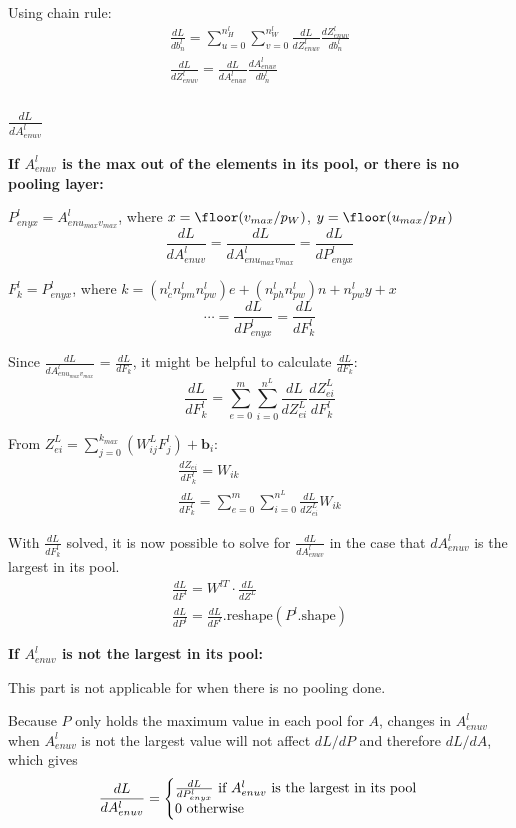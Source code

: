 \documentclass[12pt]{article}
\begin{document}
Using chain rule:
\begin{gather*}
    \frac{dL}{db^l_n} = \sum_{u=0}^{n_H^l} \sum_{v=0}^{n_W^l}
                        \frac{dL}{dZ^l_{enuv}} \frac{dZ^l_{enuv}}{db^l_n}\\
    \frac{dL}{dZ^l_{enuv}} = \frac{dL}{dA^l_{enuv}} \frac{dA^l_{enuv}}{db^l_n}
\end{gather*}

\subsubsection{$\frac{dL}{dA^l_{enuv}}$}

\textbf{If $A^l_{enuv}$ is the max out of the elements in its pool, or there is no pooling layer:}

$P^l_{enyx} = A^l_{enu_{max}v_{max}}$, where $x = \floor(v_{max}/p_{W})$, $y = \floor(u_{max}/p_H)$
\[ \frac{dL}{dA^l_{enuv}} = \frac{dL}{dA^l_{enu_{max}v_{max}}} = \frac{dL}{dP^l_{enyx}} \]

$F^l_k = P^l_{enyx}$, where $k = (n_c^l n_{pm}^l n_{pw}^l)e + (n_{ph}^l n_{pw}^l) n + n_{pw}^l y + x$
\[ \cdots = \frac{dL}{dP^l_{enyx}} = \frac{dL}{dF^l_k} \]

Since $\frac{dL}{dA^l_{enu_{max}v_{max}}}$ = $\frac{dL}{dF_k}$, it might be helpful to calculate
$\frac{dL}{dF_k}$:
\[ \frac{dL}{dF^l_k} = \sum_{e=0}^m \sum_{i=0}^{n^L} \frac{dL}{dZ^L_{ei}} \frac{dZ^L_{ei}}{dF^l_k} \]

From $Z^L_{ei} = \sum_{j=0}^{k_{max}} (W^L_{ij} F^l_j) + \bm b_i$:
\begin{gather*}
    \frac{dZ_{ei}}{dF^l_k} = W_{ik}\\
    \frac{dL}{dF^l_k} = \sum_{e=0}^m \sum_{i=0}^{n^L} \frac{dL}{dZ^L_{ei}} W_{ik}
\end{gather*}

With $\frac{dL}{dF^l_k}$ solved, it is now possible to solve for $\frac{dL}{dA^l_{enuv}}$ in
the case that $dA^l_{enuv}$ is the largest in its pool.
\begin{gather*}
    \frac{dL}{dF^l} = W^{l T} \cdot \frac{dL}{dZ^L}\\
    \frac{dL}{dP^l} = \frac{dL}{dF^l}\text{.reshape}(P^l\text{.shape})
\end{gather*}

\textbf{If $A^l_{enuv}$ is not the largest in its pool:}

This part is not applicable for when there is no pooling done.

Because $P$ only holds the maximum value in each pool for $A$, changes in $A^l_{enuv}$ when $A^l_{enuv}$
is not the largest value will not affect $dL/dP$ and therefore $dL/dA$, which gives
\[
    \frac{dL}{dA^l_{enuv}} =
    \left\{\begin{array}{@{}l@{}}
            \frac{dL}{dP^l_{enyx}} \text{ if $A^l_{enuv}$ is the largest in its pool}\\
            0 \text{ otherwise}
    \end{array}\right.\,
\]
\end{document}
